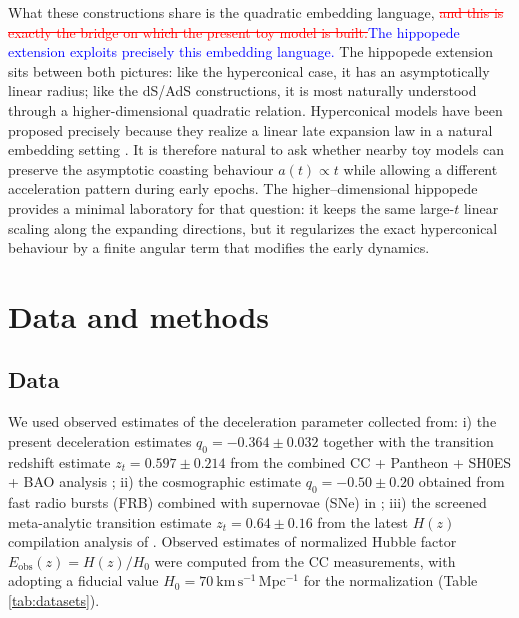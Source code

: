 \documentclass[3p,times,twocolumn]{elsarticle}
\begin{document}
What these constructions share is the quadratic embedding language, \textcolor{red}{\sout{and this is exactly the bridge on which the present toy model is built.}}\textcolor{blue}{The hippopede extension exploits precisely this embedding language.} The hippopede extension sits between both pictures: like the hyperconical case, it has an asymptotically linear radius; like the dS/AdS constructions, it is most naturally understood through a higher-dimensional quadratic relation. Hyperconical models have been proposed precisely because they realize a linear late expansion law in a natural embedding setting \cite{monjo2017hyperconical}. It is therefore natural to ask whether nearby toy models can preserve the asymptotic coasting behaviour $a(t)\propto t$ while allowing a different acceleration pattern during early epochs. The higher--dimensional hippopede provides a minimal laboratory for that question: it keeps the same large-$t$ linear scaling along the expanding directions, but it regularizes the exact hyperconical behaviour by a finite angular term that modifies the early dynamics.




\section{Data and methods}\label{sec:methods}

\subsection{Data}

We used observed estimates of the deceleration parameter collected from: i) the present deceleration estimates $q_0=-0.364\pm0.032$ together with the transition redshift estimate $z_t=0.597\pm0.214$ from the combined CC + Pantheon + SH0ES + BAO analysis \cite{myrzakulov2025q0}; ii) the cosmographic estimate $q_0=-0.50\pm0.20$ obtained from fast radio bursts (FRB) combined with supernovae (SNe) in \cite{gao2024frb}; iii) the screened meta-analytic transition estimate $z_t=0.64\pm0.16$ from the latest $H(z)$ compilation analysis of \cite{hu2025transition}. Observed estimates of normalized Hubble factor $E_{\mathrm{obs}}(z)=H(z)/H_0$ were computed from the CC measurements, with adopting a fiducial value $H_0=70~\mathrm{km\,s^{-1}\,Mpc^{-1}}$ for the normalization (Table \ref{tab:datasets}).
\end{document}
